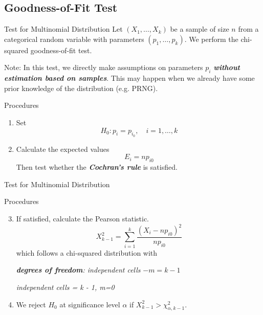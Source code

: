 \documentclass{beamer}
\newcommand{\bb}[1]{\textcolor{antiquefuchsia}{\textbf{\textit{#1}}}}
\begin{document}
\subsection{Goodness-of-Fit Test}
\begin{frame}{Test for Multinomial Distribution}
Let $\left(X_{1}, \ldots, X_{k}\right)$ be a sample of size $n$ from a categorical random variable with parameters $\left(p_{1}, \ldots, p_{k}\right)$. We perform the chi-squared goodness-of-fit test.

Note: In this test, we directly make assumptions on parameters $p_{i}$ \bb{without estimation based on samples}. This may happen when we already have some prior knowledge of the distribution (e.g. PRNG).
\begin{block}{Procedures}
\begin{enumerate}
\item Set
$$
H_{0}: p_{i}=p_{i_{0}}, \quad i=1, \ldots, k
$$
\item Calculate the expected values
$$
E_{i}=n p_{i 0}
$$
Then test whether the \bb{Cochran's rule} is satisfied.
\end{enumerate}
\end{block}
\end{frame}

\begin{frame}{Test for Multinomial Distribution}
\begin{block}{Procedures}
\begin{enumerate}
\setcounter{enumi}{2}
\item If satisfied, calculate the Pearson statistic.
$$
X_{k-1}^{2}=\sum_{i=1}^{k} \frac{\left(X_{i}-n p_{i 0}\right)^{2}}{n p_{i 0}}
$$
which follows a chi-squared distribution with 
\begin{center}
\textit{\bb{degrees of freedom}: independent cells} $-m=k-1$

\textit{independent cells = k - 1,  m=0}
\end{center}

\item We reject $H_{0}$ at significance level $\alpha$ if $X_{k-1}^{2}>\chi_{\alpha, k-1}^{2}$.
\end{enumerate}
\end{block}
\end{frame}
\end{document}

